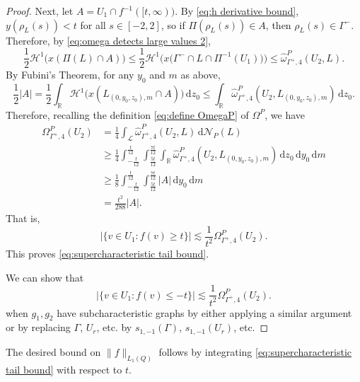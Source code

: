 \documentclass[11pt,reqno]{amsart}
\newcommand{\wwidehat}[1]{\widehat{#1}}
\newcommand{\R}{\mathbb{R}}
\newcommand{\cH}{\mathcal{H}}
\newcommand{\cL}{\mathcal{L}}
\newcommand{\cN}{\mathcal{N}}
\newcommand{\ud}[0]{\,\mathrm{d}}
\newcommand{\0}{\mathbf{0}}
\renewcommand{\1}{\mathbf 1}
\renewcommand{\mid}{:}
\renewcommand{\ge}{\geqslant}
\renewcommand{\le}{\leqslant}
\theoremstyle{remark}
\begin{document}
\begin{proof}
  Next, let $A=U_1 \cap f^{-1} ([t,\infty))$.  By \eqref{eq:h derivative bound}, $y(\rho_L(s)) < t$ for all $s\in [-2,2]$, so if $\Pi(\rho_L(s))\in A$, then $\rho_L(s)\in \Gamma^-$.  Therefore, by \eqref{eq:omega detects large values 2},
  $$\frac{1}{2} \cH^1\big(x(\Pi(L)\cap A)\big) \le \frac{1}{2} \cH^1\Big(x\big(\Gamma^-\cap L \cap \Pi^{-1}(U_1)\big)\Big) \le \wwidehat{\omega}^P_{\Gamma^+, 4}(U_2,L).$$
  By Fubini's Theorem, for any $y_0$ and $m$ as above,
  $$\frac{1}{2}|A|=\frac{1}{2} \int_\R \cH^1\big(x(L_{(0,y_0,z_0),m} \cap A)\big)\ud z_0
    \le \int_\R \wwidehat{\omega}^P_{\Gamma^+, 4}(U_2,L_{(0,y_0,z_0),m}) \ud z_0.$$
  Therefore, recalling the definition \eqref{eq:define OmegaP} of $\Omega^P$, we have
  \begin{align*}
    \Omega^P_{\Gamma^+,4}(U_2)
    &= \frac{1}{4} \int_{\cL} \wwidehat{\omega}^P_{\Gamma^+, 4}(U_2,L) \ud \cN_P(L)\\
    &\ge \frac{1}{4} \int_{-\frac{t}{12}}^{\frac{t}{12}} \int_{\frac{5t}{12}}^{\frac{7t}{12}} \int_{\R} \wwidehat{\omega}^P_{\Gamma^+, 4}(U_2,L_{(0,y_0,z_0),m}) \ud z_0 \ud y_0 \ud m \\
    &\ge \frac{1}{8} \int_{-\frac{t}{12}}^{\frac{t}{12}} \int_{\frac{5t}{12}}^{\frac{7t}{12}} |A|\ud y_0 \ud m\\
    &=\frac{t^2}{288} |A|.
  \end{align*}
  That is,
  $$|\{v\in U_1\mid f(v)\ge t\}| \lesssim \frac{1}{t^{2}} \Omega^P_{\Gamma^+,4}(U_2).$$
  This proves \eqref{eq:supercharacteristic tail bound}.

  We can show that
  $$|\{v\in U_1\mid f(v)\le -t\}| \lesssim \frac{1}{t^{2}} \Omega^P_{\Gamma^+,4}(U_2).$$
  when $g_1,g_2$ have subcharacteristic graphs by either applying a similar argument or by replacing $\Gamma$, $U_r$, etc. by $s_{1,-1}(\Gamma)$, $s_{1,-1}(U_r)$, etc.
\end{proof}

The desired bound on $\|f\|_{L_1(Q)}$ follows by integrating \eqref{eq:supercharacteristic tail bound} with respect to $t$.
\end{document}
